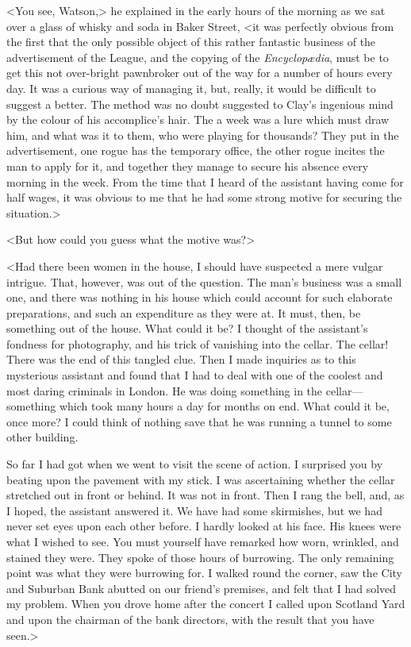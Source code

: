 <You see, Watson,> he explained in the early hours of the morning as we sat over a glass of whisky and soda in Baker Street, <it was perfectly obvious from the first that the only possible object of this rather fantastic business of the advertisement of the League, and the copying of the \textit{Encyclopædia}, must be to get this not over-bright pawnbroker out of the way for a number of hours every day. It was a curious way of managing it, but, really, it would be difficult to suggest a better. The method was no doubt suggested to Clay's ingenious mind by the colour of his accomplice's hair. The  a week was a lure which must draw him, and what was it to them, who were playing for thousands? They put in the advertisement, one rogue has the temporary office, the other rogue incites the man to apply for it, and together they manage to secure his absence every morning in the week. From the time that I heard of the assistant having come for half wages, it was obvious to me that he had some strong motive for securing the situation.>

<But how could you guess what the motive was?>

<Had there been women in the house, I should have suspected a mere vulgar intrigue. That, however, was out of the question. The man's business was a small one, and there was nothing in his house which could account for such elaborate preparations, and such an expenditure as they were at. It must, then, be something out of the house. What could it be? I thought of the assistant's fondness for photography, and his trick of vanishing into the cellar. The cellar! There was the end of this tangled clue. Then I made inquiries as to this mysterious assistant and found that I had to deal with one of the coolest and most daring criminals in London. He was doing something in the cellar—something which took many hours a day for months on end. What could it be, once more? I could think of nothing save that he was running a tunnel to some other building.

So far I had got when we went to visit the scene of action. I surprised you by beating upon the pavement with my stick. I was ascertaining whether the cellar stretched out in front or behind. It was not in front. Then I rang the bell, and, as I hoped, the assistant answered it. We have had some skirmishes, but we had never set eyes upon each other before. I hardly looked at his face. His knees were what I wished to see. You must yourself have remarked how worn, wrinkled, and stained they were. They spoke of those hours of burrowing. The only remaining point was what they were burrowing for. I walked round the corner, saw the City and Suburban Bank abutted on our friend's premises, and felt that I had solved my problem. When you drove home after the concert I called upon Scotland Yard and upon the chairman of the bank directors, with the result that you have seen.>

